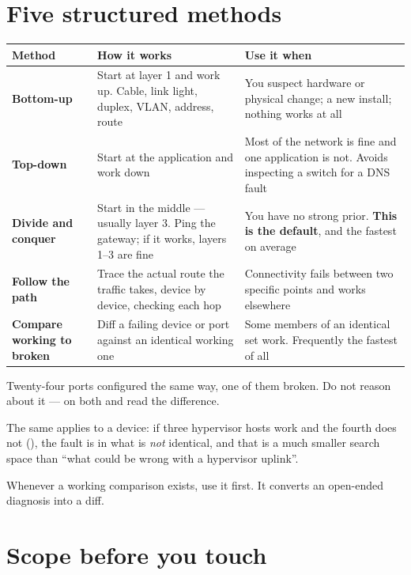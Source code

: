 \section{Five structured methods}

\begin{longtable}{@{}L{3.2cm}L{5.4cm}L{6.4cm}@{}}
\toprule
{}
\textbf{Method} & \textbf{How it works} & \textbf{Use it when} \\
\midrule
\endhead
\textbf{Bottom-up} &
Start at layer 1 and work up. Cable, link light, duplex, VLAN, address, route &
You suspect hardware or physical change; a new install; nothing works at all \\
\textbf{Top-down} &
Start at the application and work down &
Most of the network is fine and one application is not. Avoids inspecting a
switch for a DNS fault \\
\textbf{Divide and conquer} &
Start in the middle --- usually layer 3. Ping the gateway; if it works, layers
1--3 are fine &
You have no strong prior. \textbf{This is the default}, and the fastest on
average \\
\textbf{Follow the path} &
Trace the actual route the traffic takes, device by device, checking each hop &
Connectivity fails between two specific points and works elsewhere \\
\textbf{Compare working to broken} &
Diff a failing device or port against an identical working one &
Some members of an identical set work. Frequently the fastest of all \\
\bottomrule
\end{longtable}

\begin{alertbox}
Twenty-four ports configured the same way, one of them broken. Do not reason
about it ---  on both and read the difference.

The same applies to a device: if three hypervisor hosts work and the fourth does
not (), the fault is in what is \emph{not} identical, and
that is a much smaller search space than ``what could be wrong with a hypervisor
uplink''.

Whenever a working comparison exists, use it first. It converts an open-ended
diagnosis into a diff.
\end{alertbox}

\section{Scope before you touch}

